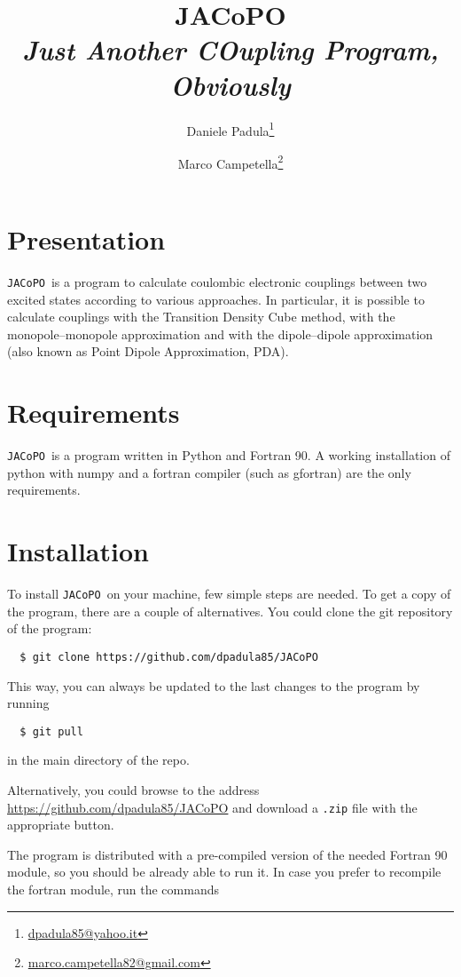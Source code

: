 \documentclass[a4paper]{article}
\title{JACoPO \\ \textit{Just Another COupling Program, Obviously}}
\author[1]{Daniele Padula\thanks{\href{mailto:dpadula85@yahoo.it}{dpadula85@yahoo.it}}}
\author[1]{Marco Campetella\thanks{\href{mailto:marco.campetella82@gmail.com}{marco.campetella82@gmail.com}}}
\affil[1]{\textit{Dipartimento di Chimica e Chimica Industriale, Universit\`a di Pisa, via G.~Moruzzi 13, 56124 Pisa, Italy}}
\newcommand{\jacopo}{\texttt{JACoPO}}
\begin{document}
\maketitle

\section*{Presentation}

\jacopo\ is a program to calculate coulombic electronic couplings between two excited states according to various approaches.
In particular, it is possible to calculate couplings with the Transition Density Cube method, with the monopole--monopole approximation
and with the dipole--dipole approximation (also known as Point Dipole Approximation, PDA).

\section*{Requirements}

\jacopo\ is a program written in Python and Fortran 90. A working installation of python with numpy and a fortran compiler (such as gfortran) are the only requirements.

\section*{Installation}

To install \jacopo\ on your machine, few simple steps are needed.
To get a copy of the program, there are a couple of alternatives.
You could clone the git repository of the program:

\begin{verbatim}
  $ git clone https://github.com/dpadula85/JACoPO 
\end{verbatim}

This way, you can always be updated to the last changes to the program by running

\begin{verbatim}
  $ git pull 
\end{verbatim}

in the main directory of the repo.

Alternatively, you could browse to the address \url{https://github.com/dpadula85/JACoPO} and download a \verb|.zip| file with the appropriate button.

The program is distributed with a pre-compiled version of the needed Fortran 90 module, so you should be already able to run it.
In case you prefer to recompile the fortran module, run the commands
\end{document}
